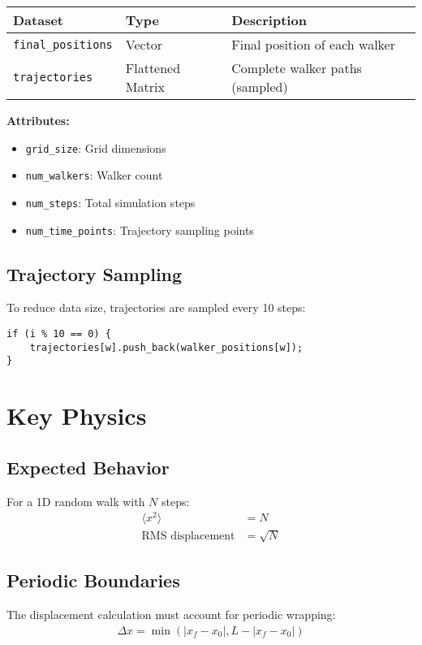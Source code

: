 \documentclass[11pt,a4paper]{article}
\begin{document}
\begin{table}[h]
\centering
\begin{tabular}{|l|l|p{6cm}|}
\hline
\textbf{Dataset} & \textbf{Type} & \textbf{Description} \\
\hline
\texttt{final\_positions} & Vector & Final position of each walker \\
\texttt{trajectories} & Flattened Matrix & Complete walker paths (sampled) \\
\hline
\end{tabular}
\end{table}

\textbf{Attributes:}
\begin{itemize}
    \item \texttt{grid\_size}: Grid dimensions
    \item \texttt{num\_walkers}: Walker count
    \item \texttt{num\_steps}: Total simulation steps
    \item \texttt{num\_time\_points}: Trajectory sampling points
\end{itemize}

\subsection{Trajectory Sampling}
To reduce data size, trajectories are sampled every 10 steps:
\begin{lstlisting}[caption=Trajectory storage optimization]
if (i % 10 == 0) {
    trajectories[w].push_back(walker_positions[w]);
}
\end{lstlisting}

\section{Key Physics}

\subsection{Expected Behavior}
For a 1D random walk with $N$ steps:
\begin{align}
\langle x^2 \rangle &= N \\
\text{RMS displacement} &= \sqrt{N}
\end{align}

\subsection{Periodic Boundaries}
The displacement calculation must account for periodic wrapping:
\begin{align}
\Delta x = \min(|x_f - x_0|, L - |x_f - x_0|)
\end{align}
\end{document}
